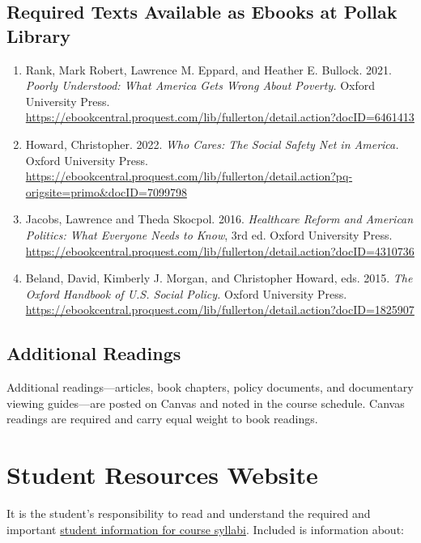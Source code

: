 \documentclass[12pt]{article}
\begin{document}
\subsection*{Required Texts Available as Ebooks at Pollak Library}

\begin{enumerate}
    \item Rank, Mark Robert, Lawrence M. Eppard, and Heather E. Bullock. 2021. \emph{Poorly Understood: What America Gets Wrong About Poverty.} Oxford University Press. \\ \url{https://ebookcentral.proquest.com/lib/fullerton/detail.action?docID=6461413}
    \item Howard, Christopher. 2022. \emph{Who Cares: The Social Safety Net in America.} Oxford University Press. \\ \url{https://ebookcentral.proquest.com/lib/fullerton/detail.action?pq-origsite=primo&docID=7099798}
    \item Jacobs, Lawrence and Theda Skocpol. 2016. \emph{Healthcare Reform and American Politics: What Everyone Needs to Know}, 3rd ed. Oxford University Press. \\ \url{https://ebookcentral.proquest.com/lib/fullerton/detail.action?docID=4310736}
    \item Beland, David, Kimberly J. Morgan, and Christopher Howard, eds. 2015. \emph{The Oxford Handbook of U.S. Social Policy.} Oxford University Press. \\ \url{https://ebookcentral.proquest.com/lib/fullerton/detail.action?docID=1825907}
\end{enumerate}

\subsection*{Additional Readings}

Additional readings---articles, book chapters, policy documents, and documentary viewing guides---are posted on Canvas and noted in the course schedule. Canvas readings are required and carry equal weight to book readings.

\section*{Student Resources Website}
It is the student's responsibility to read and understand the required and important \href{https://fdc.fullerton.edu/teaching/student-info-syllabi.html}{student information for course syllabi}. Included is information about:
\end{document}
